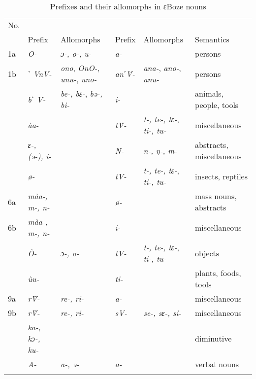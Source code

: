 \documentclass[output=paper]{langsci/langscibook}
\begin{document}
\begin{table}
\caption{\label{tab:kainji:14} Prefixes and their allomorphs in ɛBoze nouns}
 
\begin{tabularx}{\textwidth}{l >{\raggedright}p{1.3cm}>{\raggedright}p{2.2cm} >{\raggedright}p{1cm}>{\raggedright}p{2.2cm} Q}
\lsptoprule
{No.}	& 	& & \\
	& {Prefix}	& {Allomorphs}	& {Prefix}	& {Allomorphs}	& {Semantics}\\
\midrule
1a	& \textit{O-}	& \textit{ɔ-, o-, u-}	& \textit{a-}	& 	& persons\\
\tablevspace
1b	& \textit{ˋ VnV-}	& \textit{ono}, 
			  \textit{OnO-},\newline
			  \textit{unu-}, 
			  \textit{uno-}	& \textit{anˊ\'{V}-}	& \textit{ana-}, 
						  \textit{ano-},\newline
						  \textit{anu-}	& persons\\
	& \textit{bˋ V-} & \textit{be-, bɛ-},\newline
		  \textit{bə-, bi-} 	& \textit{i-}	& 	& animals, people, tools\\
	& \textit{àa-}	& 	& \textit{t\`{V}-}	& \textit{t-, te-, tɛ-},\newline
					  \textit{ti-, tu-} & miscellaneous\\
	& \textit{ɛ-, (ə-), i-}	& 	& \textit{N-}	& \textit{n-, ŋ-, m-}	&abstracts, miscellaneous\\
	& \textit{ø-}	& 	& \textit{tV-}	& \textit{t-, te-, tɛ-}, \newline
				  \textit{ti-, tu-} & insects, reptiles\\
\tablevspace
6a	& \textit{màa-, m-, n-}	& 	& \textit{ø-}	& 	& mass nouns, abstracts\\
\tablevspace
6b	& \textit{màa-, m-, n-}	& 	& \textit{i-}	& 	& miscellaneous\\
	& \textit{\`{O}-}	& \textit{ɔ-, o-}	& \textit{tV-}	& \textit{t-, te-, tɛ-},\newline
						  \textit{ti-, tu-} & objects\\
	& \textit{ùu-}	& 	& \textit{ti-}	& 	& plants, foods, tools\\
\tablevspace
9a	& \textit{r\`{V}-}	& \textit{re-, ri-}	& \textit{a-}	& 	& miscellaneous\\
\tablevspace
9b	& \textit{r\`{V}-}	& \textit{re-, ri-}	& \textit{sV-}	& \textit{se-, sɛ-, si-}	& miscellaneous\\
	& \textit{ka-, kɔ-, ku-}	& 	& 	& 	& diminutive\\
	& \textit{A-}	& \textit{a-, ə-}	& \textit{a-}	& 	& verbal nouns\\
\lspbottomrule
\end{tabularx}
\end{table}
\end{document}
